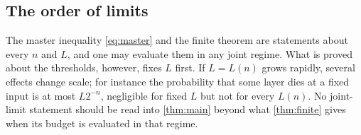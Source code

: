 \subsection{The order of limits}

The master inequality \cref{eq:master} and the finite theorem are statements about every $n$ and $L$, and one may evaluate them in any joint regime. What is proved about the thresholds, however, fixes $L$ first. If $L=L(n)$ grows rapidly, several effects change scale; for instance the probability that some layer dies at a fixed input is at most $L2^{-n}$, negligible for fixed $L$ but not for every $L(n)$. No joint-limit statement should be read into \cref{thm:main} beyond what \cref{thm:finite} gives when its budget is evaluated in that regime.
